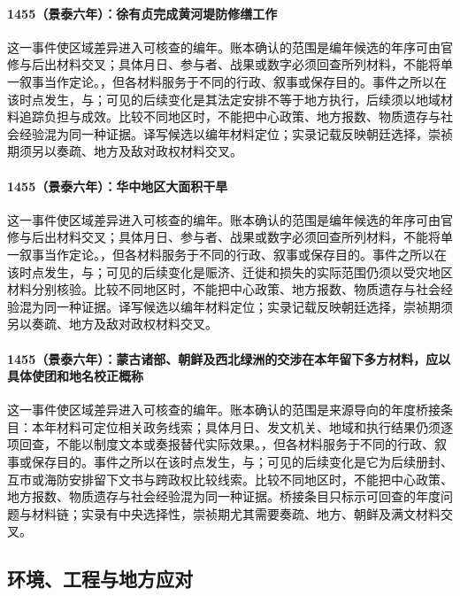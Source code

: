 \paragraph{1455（景泰六年）：徐有贞完成黄河堤防修缮工作} 这一事件使区域差异进入可核查的编年。账本确认的范围是编年候选的年序可由官修与后出材料交叉；具体月日、参与者、战果或数字必须回查所列材料，不能将单一叙事当作定论。，但各材料服务于不同的行政、叙事或保存目的。事件之所以在该时点发生，与；可见的后续变化是其法定安排不等于地方执行，后续须以地域材料追踪负担与成效。比较不同地区时，不能把中心政策、地方报数、物质遗存与社会经验混为同一种证据。译写候选以编年材料定位；实录记载反映朝廷选择，崇祯期须另以奏疏、地方及敌对政权材料交叉。

\paragraph{1455（景泰六年）：华中地区大面积干旱} 这一事件使区域差异进入可核查的编年。账本确认的范围是编年候选的年序可由官修与后出材料交叉；具体月日、参与者、战果或数字必须回查所列材料，不能将单一叙事当作定论。，但各材料服务于不同的行政、叙事或保存目的。事件之所以在该时点发生，与；可见的后续变化是赈济、迁徙和损失的实际范围仍须以受灾地区材料分别核验。比较不同地区时，不能把中心政策、地方报数、物质遗存与社会经验混为同一种证据。译写候选以编年材料定位；实录记载反映朝廷选择，崇祯期须另以奏疏、地方及敌对政权材料交叉。

\paragraph{1455（景泰六年）：蒙古诸部、朝鲜及西北绿洲的交涉在本年留下多方材料，应以具体使团和地名校正概称} 这一事件使区域差异进入可核查的编年。账本确认的范围是来源导向的年度桥接条目：本年材料可定位相关政务线索；具体月日、发文机关、地域和执行结果仍须逐项回查，不能以制度文本或奏报替代实际效果。，但各材料服务于不同的行政、叙事或保存目的。事件之所以在该时点发生，与；可见的后续变化是它为后续册封、互市或海防安排留下文书与跨政权比较线索。比较不同地区时，不能把中心政策、地方报数、物质遗存与社会经验混为同一种证据。桥接条目只标示可回查的年度问题与材料链；实录有中央选择性，崇祯期尤其需要奏疏、地方、朝鲜及满文材料交叉。

\subsection{环境、工程与地方应对}

